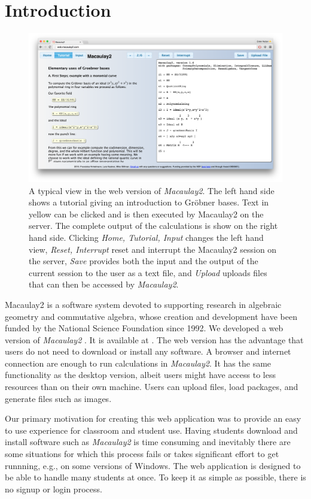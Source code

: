 \documentclass[twocolumn]{article}
\def\M2{{\it Macaulay2}}
\begin{document}
\section{Introduction}
\begin{figure}[htb]
    \includegraphics[width=.99\textwidth]{homeWebsite.jpg}
    \caption{A typical view in the web version of \M2. The left hand
        side shows a tutorial giving an introduction to Gr\"obner
        bases. Text in yellow can be clicked and is then executed by
        Macaulay2 on the server. The complete output of the calculations
        is show on the right hand side. Clicking {\it Home, Tutorial, Input}
        changes the left hand view, {\it Reset, Interrupt}
        reset and interrupt the Macaulay2 session on the server, {\it
        Save} provides both the input and the output of the current
        session to the user as a text file, and {\it Upload} uploads files
        that can then be accessed by \M2.}
\label{fig:home}
\end{figure}



Macaulay2 is a software system devoted to supporting research
in algebraic geometry and commutative algebra, whose creation and
development have been funded by the National Science Foundation
since 1992. We developed a web version of \M2 \cite{M2}. It is available at \cite{webM2}.
The web version has the advantage that users do not need to
download or install any software. A browser and internet connection are enough to
run calculations in \M2. It
has the same functionality as the desktop version,
albeit users might have access to less resources
than on their own machine. Users can upload files,
load packages, and generate files such as images.

Our primary motivation for creating this web application was to
provide an easy to use experience for classroom and student use.
Having students download and install software such as \M2 is time
consuming and inevitably there are some situations for which this
process fails or takes significant effort to get runnning, e.g., on
some versions of Windows.  The web application is designed to
be able to handle many students at once. To keep it as simple as possible,
there is no signup or login process.
\end{document}

